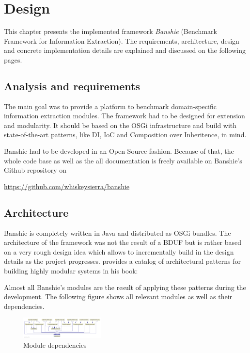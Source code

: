 \section{Design}
\label{sec:design}

This chapter presents the implemented framework \textit{Banshie} (Benchmark Framework for Information Extraction). The requirements, architecture, design and concrete implementation details are explained and discussed on the following pages.

\subsection{Analysis and requirements}
The main goal was to provide a platform to benchmark domain-specific information extraction modules. The framework had to be designed for extension and modularity. It should be based on the OSGi infrastructure and build with state-of-the-art patterns, like \gls{DI}, \gls{IoC} and Composition over Inheritence, in mind.

Banshie had to be developed in an Open Source fashion. Because of that, the whole code base as well as the all documentation is freely available on Banshie's Github repository on

\url{https://github.com/whiskeysierra/banshie}

\subsection{Architecture}
Banshie is completely written in Java and distributed as OSGi bundles. The architecture of the framework was not the result of a \gls{BDUF} but is rather based on a very rough design idea which allows to incrementally build in the design details as the project progresses. \citeauthor{Knoernschild:2012} provides a catalog of architectural patterns for building highly modular systems in his book:


Almost all Banshie's modules are the result of applying these patterns during the development. The following figure shows all relevant modules as well as their dependencies.

\newpage
\begin{figure}[H]
\centering
\includegraphics[angle=90, width=0.38\textwidth]{module-dependencies.png}
\caption{Module dependencies}
\label{fig:module-dependencies}
\end{figure}

